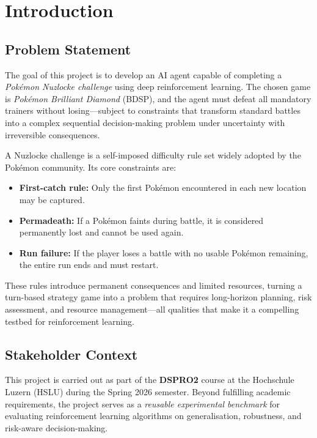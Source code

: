 \chapter{Introduction}

\section{Problem Statement}

The goal of this project is to develop an AI agent capable of completing a
\emph{Pok\'{e}mon Nuzlocke challenge} using deep reinforcement learning.
The chosen game is \emph{Pok\'{e}mon Brilliant Diamond} (BDSP), and the agent
must defeat all mandatory trainers without losing---subject to constraints that
transform standard battles into a complex sequential decision-making problem
under uncertainty with irreversible consequences.

A Nuzlocke challenge is a self-imposed difficulty rule set widely adopted by the
Pok\'{e}mon community.  Its core constraints are:

\begin{itemize}
  \item \textbf{First-catch rule:} Only the first Pok\'{e}mon encountered in
        each new location may be captured.
  \item \textbf{Permadeath:} If a Pok\'{e}mon faints during battle, it is
        considered permanently lost and cannot be used again.
  \item \textbf{Run failure:} If the player loses a battle with no usable
        Pok\'{e}mon remaining, the entire run ends and must restart.
\end{itemize}

These rules introduce permanent consequences and limited resources, turning a
turn-based strategy game into a problem that requires long-horizon planning,
risk assessment, and resource management---all qualities that make it a
compelling testbed for reinforcement learning.

\section{Stakeholder Context}

This project is carried out as part of the \textbf{DSPRO2} course at the
Hochschule Luzern (HSLU) during the Spring 2026 semester.  Beyond fulfilling
academic requirements, the project serves as a \emph{reusable experimental
benchmark} for evaluating reinforcement learning algorithms on generalisation,
robustness, and risk-aware decision-making.


